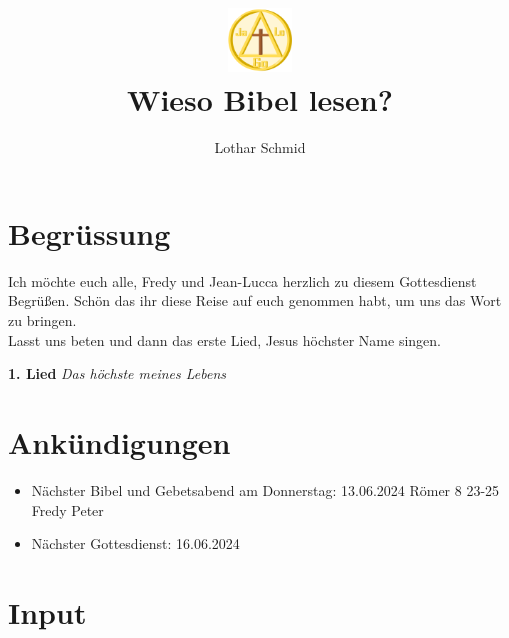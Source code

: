 \documentclass{../inc/mybib}
\title{\includegraphics[height=48pt]{assets/images/logo.png}\\Wieso Bibel lesen?}
\author{Lothar Schmid}
\begin{document}
\maketitle

\section{Begrüssung}
Ich möchte euch alle, Fredy und Jean-Lucca herzlich zu diesem Gottesdienst Begrüßen. Schön das ihr diese Reise auf euch genommen habt, um uns das Wort zu bringen. \\Lasst uns beten und dann das erste Lied, Jesus höchster Name singen.

\textbf{1. Lied}
\textit{Das höchste meines Lebens}

\section{Ankündigungen}
\begin{itemize}
    \item Nächster Bibel und Gebetsabend am Donnerstag: 
13.06.2024 Römer 8 23-25 Fredy Peter
    \item Nächster Gottesdienst: 16.06.2024 
\end{itemize}

\section{ Input }
\end{document}
